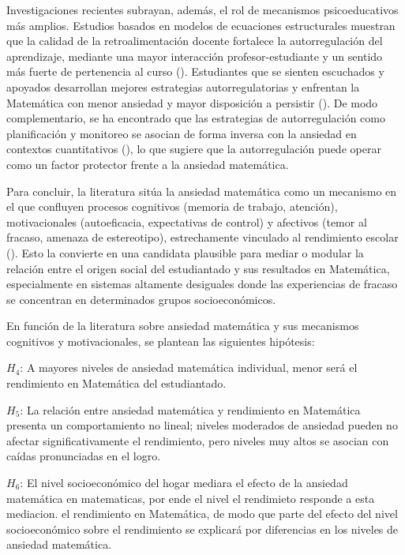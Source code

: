 \documentclass[
  spanish,
  a4paper,
  oneside]{scrbook}
\begin{document}
Investigaciones recientes subrayan, además, el rol de mecanismos
psicoeducativos más amplios. Estudios basados en modelos de ecuaciones
estructurales muestran que la calidad de la retroalimentación docente
fortalece la autorregulación del aprendizaje, mediante una mayor
interacción profesor-estudiante y un sentido más fuerte de pertenencia
al curso (). Estudiantes
que se sienten escuchados y apoyados desarrollan mejores estrategias
autorregulatorias y enfrentan la Matemática con menor ansiedad y mayor
disposición a persistir (). De modo complementario, se ha encontrado que las estrategias de
autorregulación como planificación y monitoreo se asocian de forma
inversa con la ansiedad en contextos cuantitativos
(), lo
que sugiere que la autorregulación puede operar como un factor protector
frente a la ansiedad matemática.

Para concluir, la literatura sitúa la ansiedad matemática como un
mecanismo en el que confluyen procesos cognitivos (memoria de trabajo,
atención), motivacionales (autoeficacia, expectativas de control) y
afectivos (temor al fracaso, amenaza de estereotipo), estrechamente
vinculado al rendimiento escolar (). Esto la convierte en una candidata plausible para mediar
o modular la relación entre el origen social del estudiantado y sus
resultados en Matemática, especialmente en sistemas altamente desiguales
donde las experiencias de fracaso se concentran en determinados grupos
socioeconómicos.

En función de la literatura sobre ansiedad matemática y sus mecanismos
cognitivos y motivacionales, se plantean las siguientes hipótesis:

\(H_{4}\): A mayores niveles de ansiedad matemática individual, menor
será el rendimiento en Matemática del estudiantado.

\(H_{5}\): La relación entre ansiedad matemática y rendimiento en
Matemática presenta un comportamiento no lineal; niveles moderados de
ansiedad pueden no afectar significativamente el rendimiento, pero
niveles muy altos se asocian con caídas pronunciadas en el logro.

\(H_{6}\): El nivel socioeconómico del hogar mediara el efecto de la
ansiedad matemática en matematicas, por ende el nivel el rendimieto
responde a esta mediacion. el rendimiento en Matemática, de modo que
parte del efecto del nivel socioeconómico sobre el rendimiento se
explicará por diferencias en los niveles de ansiedad matemática.
\end{document}
